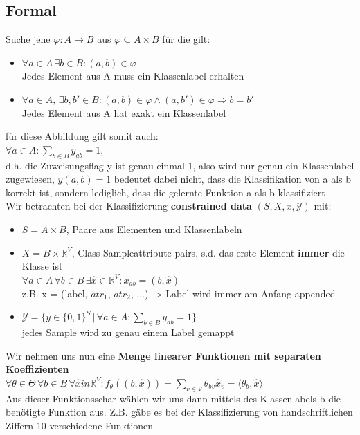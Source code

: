 \documentclass[12pt,a4paper]{article}
\newcommand{\nl}{\\[0.1cm]}
\begin{document}
\subsection{Formal}
Suche jene $\varphi: A\rightarrow B$ aus $\varphi \subseteq	A \times B$ für die gilt:
\begin{itemize}
\item $\forall a\in A \, \exists b\in B: (a,b) \in \varphi$\\
Jedes Element aus A muss ein Klassenlabel erhalten
\item $\forall a\in A, \, \exists b,b' \in B: (a,b) \in \varphi \land (a,b')\in\varphi \Rightarrow b=b'$\\
Jedes Element aus A hat exakt ein Klassenlabel
\end{itemize}
für diese Abbildung gilt somit auch:\nl
$\displaystyle \forall a\in A: \sum_{b\in B} y_{ab} = 1$,\nl
d.h. die Zuweisungsflag y ist genau einmal 1, also wird nur genau ein Klassenlabel zugewiesen, $y(a,b) = 1$ bedeutet dabei nicht, dass die Klassifikation von a als b korrekt ist, sondern lediglich, dass die gelernte Funktion a als b klassifiziert\nl
Wir betrachten bei der Klassifizierung \textbf{constrained data} $(S,X,x,\mathcal{Y})$ mit:
\begin{itemize}
\item $S = A \times B$, Paare aus Elementen und Klassenlabeln
\item $X=B\times \mathbb{R}^V$, Class-Sampleattribute-pairs, s.d. das erste Element \textbf{immer} die Klasse ist\\
$\forall a \in A\, \forall b\in B \, \exists \hat{x} \in \mathbb{R}^V: x_{ab} = (b,\hat{x})$\\
z.B. x = (label, $atr_1$, $atr_2$, ...) -> Label wird immer am Anfang appended
\item $\displaystyle \mathcal{Y} = \big\{y\in \{0,1\}^S \, \big\vert \, \forall a \in A : \sum_{b\in B} y_{ab} = 1 \big\}$\\
jedes Sample wird zu genau einem Label gemappt
\end{itemize}
Wir nehmen uns nun eine \textbf{Menge linearer Funktionen mit separaten Koeffizienten}\nl
$\displaystyle \forall \theta\in\Theta \, \forall b\in B \, \forall \hat{x} in \mathbb{R}^V: f_\theta((b,\hat{x})) = \sum_{v\in V} \theta_{bv} \hat{x}_v = \langle \theta_b, \hat{x}\rangle$\nl
Aus dieser Funktionsschar wählen wir uns dann mittels des Klassenlabels b die benötigte Funktion aus. Z.B. gäbe es bei der Klassifizierung von handschriftlichen Ziffern 10 verschiedene Funktionen\nl
\end{document}
